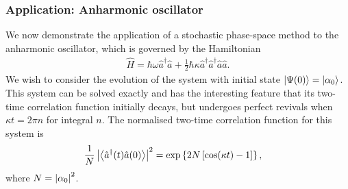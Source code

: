 \subsubsection{Application: Anharmonic oscillator}

We now demonstrate the application of a stochastic phase-space method to the anharmonic oscillator, which is governed by the Hamiltonian
\begin{align}
    \hat{H} = \hbar \omega \hat{a}^\dagger \hat{a} + \frac{1}{2} \hbar \kappa \hat{a}^\dagger \hat{a}^\dagger \hat{a} \hat{a}. \label{BackgroundTheory:AnharmonicOscillator:Hamiltonian}
\end{align}
We wish to consider the evolution of the system with initial state ${\left|\Psi(0)\right>} = {\left|\alpha_0\right>}$.  This system can be solved exactly and has the interesting feature that its two-time correlation function initially decays, but undergoes perfect revivals when $\kappa t = 2 \pi n$ for integral $n$.  The normalised two-time correlation function for this system is
\begin{align}
    \frac{1}{N}\abs{\mean{\hat{a}^\dagger(t) \hat{a}(0)}}^2 &= \exp \left\{2 N \left[\cos(\kappa t) - 1 \right] \right\}, \label{BackgroundTheory:AnharmonicOscillator:ExactTwoTimeCorrelationFunction}
\end{align}
where $N = \left|\alpha_0\right|^2$.


